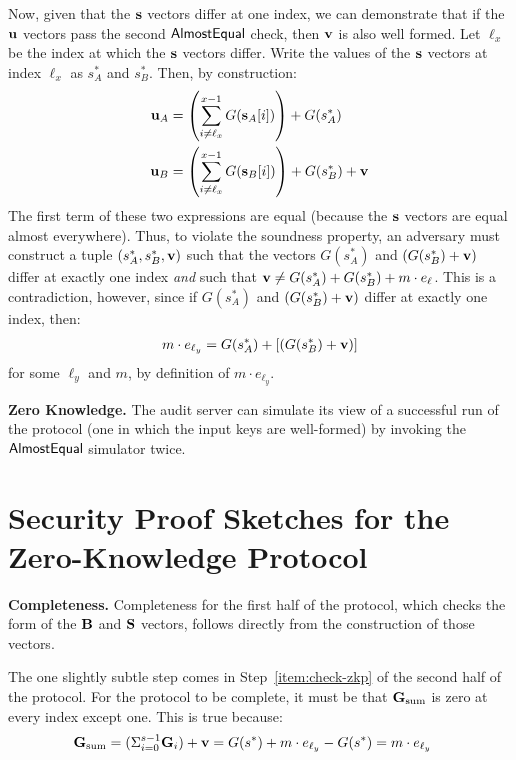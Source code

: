 \documentclass[10pt,twocolumn]{article}
\newcommand{\nicepara}[1]{\medskip\noindent\textbf{#1.}}
\begin{document}
{Now, given that the ${\bf s}$ vectors differ at one index, we
can demonstrate that if the ${\bf u}$ vectors pass the second
${\sf AlmostEqual}$ check, then ${\bf v}$ is also well formed.
Let $\ell_x$ be the index at which the ${\bf s}$ vectors differ.
Write the values of the ${\bf s}$ vectors at index $\ell_x$
as $s^*_A$ and $s^*_B$.
Then, by construction:
\begin{align*}
  {\bf u}_A &= \left(\sum_{i \neq \ell_x}^{x-1} G({\bf s}_A[i])\right) + G(s^*_A)\\
  {\bf u}_B &= \left(\sum_{i \neq \ell_x}^{x-1} G({\bf s}_B[i])\right) + G(s^*_B) + {\bf v}
\end{align*}
The first term of these two expressions are equal (because the
${\bf s}$ vectors are equal almost everywhere).
Thus, to violate the soundness property, an adversary must construct
a tuple $(s^*_A, s^*_B, {\bf v})$ such that the vectors
$G(s^*_A)$ and $(G(s^*_B) + {\bf v})$ differ at exactly one
index {\em and} such that ${\bf v} \neq G(s^*_A) + G(s^*_B) + m \cdot e_{\ell}$.
This is a contradiction, however, since if 
$G(s^*_A)$ and $(G(s^*_B) + {\bf v})$ differ at exactly one index,
then: 
\begin{align*}
  m \cdot e_{\ell_y} = G(s^*_A) + [(G(s^*_B) + {\bf v})]
\end{align*}
for some $\ell_y$ and $m$, by definition of $m \cdot e_{\ell_y}$.

\nicepara{Zero Knowledge}
The audit server can simulate its view of a successful
run of the protocol (one in which the input keys are
well-formed) by invoking the ${\sf AlmostEqual}$ simulator twice.
 \section{Security Proof Sketches for the\\Zero-Knowledge Protocol}
\label{app:zkp-proof}

\nicepara{Completeness}
Completeness for the first half of the protocol,
which checks the form of the ${\bf B}$ and ${\bf S}$ vectors,
follows directly from the construction of those vectors.

The one slightly subtle step comes in Step~\ref{item:check-zkp}
of the second half of the protocol. 
For the protocol to be complete, it must be that
${\bf G}_\textrm{sum}$ is zero at every index except one.
This is true because:
\begin{align*}
{\bf G}_\textrm{sum} = (\Sigma_{i=0}^{s-1} {\bf G}_i) + {\bf v} &= G(s^*) + m \cdot e_{\ell_y} - G(s^*) = m \cdot e_{\ell_y}
\end{align*}

}
\end{document}
